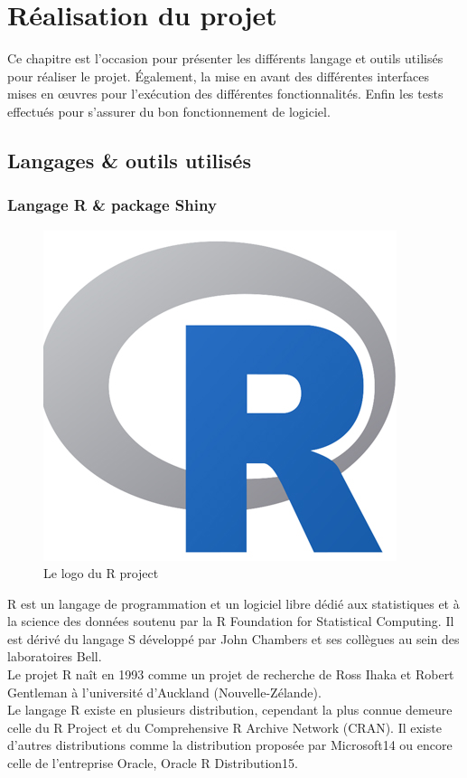 \section{Réalisation du projet}
Ce chapitre est l’occasion pour présenter les différents langage et outils utilisés pour réaliser le projet. Également, la mise en avant des différentes interfaces mises en œuvres pour l’exécution des différentes fonctionnalités. Enfin les tests effectués pour s’assurer du bon fonctionnement de logiciel.


\subsection {Langages \& outils utilisés}
\subsubsection {Langage R \& package Shiny}

\begin{figure}[!h]
	\center
	\includegraphics[scale=0.2]{img/R_logo.png}
	\caption {Le logo du R project}
\end{figure}
R est un langage de programmation et un logiciel libre dédié aux statistiques et à la science des données soutenu par la R Foundation for Statistical Computing. Il est dérivé du langage S développé par John Chambers et ses collègues au sein des laboratoires Bell.\\
Le projet R naît en 1993 comme un projet de recherche de Ross Ihaka et Robert Gentleman à l'université d'Auckland (Nouvelle-Zélande). \\
Le langage R existe en plusieurs distribution, cependant la plus connue demeure celle du R Project et du Comprehensive R Archive Network (CRAN). Il existe d'autres distributions comme la distribution proposée par Microsoft14 ou encore celle de l'entreprise Oracle, Oracle R Distribution15.\\


